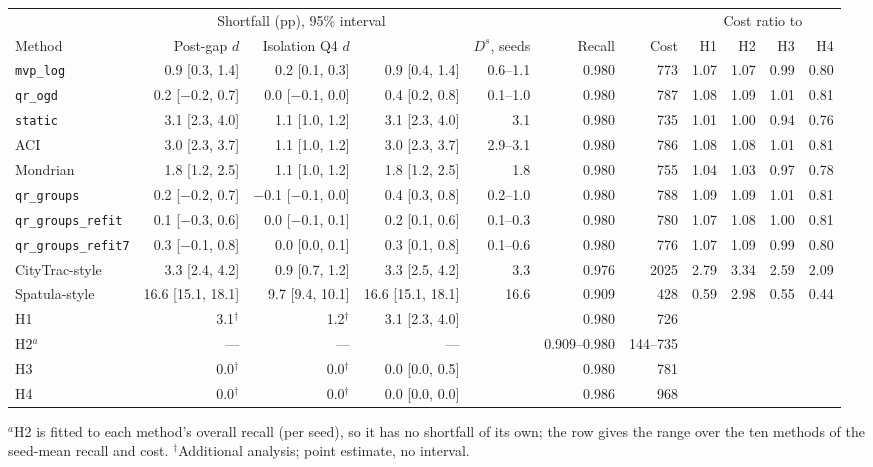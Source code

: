 \begin{tabular}{@{}lrrrrrrrrrr@{}}
\toprule
 & \multicolumn{3}{c}{Shortfall (pp), 95\% interval} & & & & \multicolumn{4}{c}{Cost ratio to} \\
\cmidrule(lr){2-4}\cmidrule(l){8-11}
Method & Post-gap $d$ & Isolation Q4 $d$ & \Dbar{} & $D^s$, seeds & Recall & Cost & H1 & H2 & H3 & H4 \\
\midrule
\texttt{mvp\_log} & 0.9 [0.3, 1.4] & 0.2 [0.1, 0.3] & 0.9 [0.4, 1.4] & 0.6--1.1 & 0.980 & 773 & 1.07 & 1.07 & 0.99 & 0.80 \\
\texttt{qr\_ogd} & 0.2 [$-$0.2, 0.7] & 0.0 [$-$0.1, 0.0] & 0.4 [0.2, 0.8] & 0.1--1.0 & 0.980 & 787 & 1.08 & 1.09 & 1.01 & 0.81 \\
\addlinespace
\texttt{static} & 3.1 [2.3, 4.0] & 1.1 [1.0, 1.2] & 3.1 [2.3, 4.0] & 3.1 & 0.980 & 735 & 1.01 & 1.00 & 0.94 & 0.76 \\
ACI & 3.0 [2.3, 3.7] & 1.1 [1.0, 1.2] & 3.0 [2.3, 3.7] & 2.9--3.1 & 0.980 & 786 & 1.08 & 1.08 & 1.01 & 0.81 \\
Mondrian & 1.8 [1.2, 2.5] & 1.1 [1.0, 1.2] & 1.8 [1.2, 2.5] & 1.8 & 0.980 & 755 & 1.04 & 1.03 & 0.97 & 0.78 \\
\texttt{qr\_groups} & 0.2 [$-$0.2, 0.7] & $-$0.1 [$-$0.1, 0.0] & 0.4 [0.3, 0.8] & 0.2--1.0 & 0.980 & 788 & 1.09 & 1.09 & 1.01 & 0.81 \\
\texttt{qr\_groups\_refit} & 0.1 [$-$0.3, 0.6] & 0.0 [$-$0.1, 0.1] & 0.2 [0.1, 0.6] & 0.1--0.3 & 0.980 & 780 & 1.07 & 1.08 & 1.00 & 0.81 \\
\texttt{qr\_groups\_refit7} & 0.3 [$-$0.1, 0.8] & 0.0 [0.0, 0.1] & 0.3 [0.1, 0.8] & 0.1--0.6 & 0.980 & 776 & 1.07 & 1.09 & 0.99 & 0.80 \\
CityTrac-style & 3.3 [2.4, 4.2] & 0.9 [0.7, 1.2] & 3.3 [2.5, 4.2] & 3.3 & 0.976 & 2025 & 2.79 & 3.34 & 2.59 & 2.09 \\
Spatula-style & 16.6 [15.1, 18.1] & 9.7 [9.4, 10.1] & 16.6 [15.1, 18.1] & 16.6 & 0.909 & 428 & 0.59 & 2.98 & 0.55 & 0.44 \\
\addlinespace
H1 & 3.1$^\dagger$ & 1.2$^\dagger$ & 3.1 [2.3, 4.0] & & 0.980 & 726 &  &  &  & \\
H2$^{a}$ & --- & --- & --- & & 0.909--0.980 & 144--735 &  &  &  & \\
H3 & 0.0$^\dagger$ & 0.0$^\dagger$ & 0.0 [0.0, 0.5] & & 0.980 & 781 &  &  &  & \\
H4 & 0.0$^\dagger$ & 0.0$^\dagger$ & 0.0 [0.0, 0.0] & & 0.986 & 968 &  &  &  & \\
\bottomrule
\end{tabular}

\smallskip\parbox{\textwidth}{\footnotesize $^{a}$H2 is fitted to each method's overall recall (per seed), so it has no shortfall of its own; the row gives the range over the ten methods of the seed-mean recall and cost. $^\dagger$Additional analysis; point estimate, no interval.}
